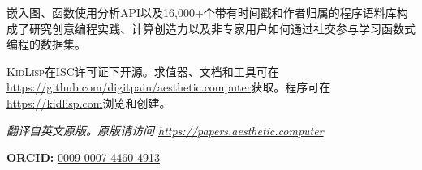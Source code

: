 \documentclass[10pt,letterpaper,twocolumn]{article}
\newcommand{\kidlisp}{\textsc{KidLisp}}
\begin{document}
嵌入图、函数使用分析API以及16,000+个带有时间戳和作者归属的程序语料库构成了研究创意编程实践、计算创造力以及非专家用户如何通过社交参与学习函数式编程的数据集。

\kidlisp{}在ISC许可证下开源。求值器、文档和工具可在\url{https://github.com/digitpain/aesthetic.computer}获取。程序可在\url{https://kidlisp.com}浏览和创建。

\vspace{0.5em}
\noindent\textit{翻译自英文原版。原版请访问 \url{https://papers.aesthetic.computer}}

\vspace{0.5em}
\noindent\textbf{ORCID:} \href{https://orcid.org/0009-0007-4460-4913}{0009-0007-4460-4913}



\end{document}

